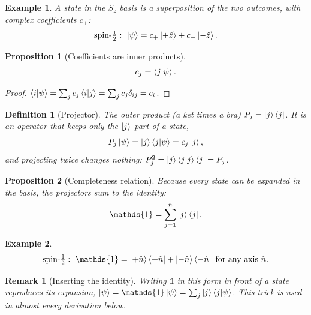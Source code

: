 \documentclass{article}
\newtheorem{definition}{Definition}
\newtheorem*{example}{Example}
\newtheorem{remark}{Remark}
\newtheorem{proposition}{Proposition}
\newcommand{\id}{\mathds{1}}
\begin{document}
\begin{example}
    A state in the $S_z$ basis is a superposition of the two outcomes, with complex coefficients $c_\pm$:
    \[\text{spin-}\tfrac12: \ \ket{\psi} = c_{+}\ket{+\hat{z}} + c_{-}\ket{-\hat{z}}.\]
\end{example}
\begin{proposition}[Coefficients are inner products]
    \begin{equation}
        c_j = \braket{j|\psi}.
    \end{equation}
\end{proposition}
\begin{proof}
    $\braket{i|\psi} = \sum_j c_j\braket{i|j} = \sum_j c_j\delta_{ij} = c_i$.
\end{proof}
\begin{definition}[Projector]
    The outer product (a ket times a bra) $P_j = \ket{j}\bra{j}$. It is an operator that keeps only the $\ket{j}$ part of a state,
    \[P_j\ket{\psi} = \ket{j}\braket{j|\psi} = c_j\ket{j},\]
    and projecting twice changes nothing: $P_j^2 = \ket{j}\braket{j|j}\bra{j} = P_j$.
\end{definition}
\begin{proposition}[Completeness relation]
    Because every state can be expanded in the basis, the projectors sum to the identity:
    \begin{equation}
        \id = \sum_{j=1}^{n}\ket{j}\bra{j}.
    \end{equation}
\end{proposition}
\begin{example}
    \[\text{spin-}\tfrac12: \ \id = \ket{+\hat{n}}\bra{+\hat{n}} + \ket{-\hat{n}}\bra{-\hat{n}} \text{ for any axis } \hat{n}.\]
\end{example}
\begin{remark}[Inserting the identity]
    Writing $\id$ in this form in front of a state reproduces its expansion, $\ket{\psi} = \id\ket{\psi} = \sum_j\ket{j}\braket{j|\psi}$. This trick is used in almost every derivation below.
\end{remark}
\end{document}
